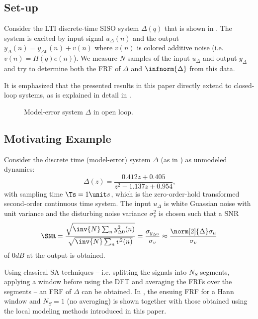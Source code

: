 \subsection{Set-up}
Consider the \gls{LTI} discrete-time \gls{SISO} system $\Delta(q)$ that is shown in . 
The system is excited by input signal $u_{\Delta}(n)$ and the output $y_{\Delta}(n) = y_{\Delta0}(n) + v(n)$ where $v(n)$ is colored additive noise (i.e. $v(n) = H(q)e(n)$).
We measure $N$ samples of the input $u_{\Delta}$ and output $y_{\Delta}$ and try to determine both the \gls{FRF} of $\Delta$ and $\infnorm{\Delta}$ from this data.

It is emphasized that the presented results in this paper directly extend to closed-loop systems, as is explained in detail in . 
\begin{figure}
  \centering
  
  \caption{Model-error system $\Delta$ in open loop.}
  \label{fig:DeltaOpenLoop}
\end{figure}

\subsection{Motivating Example}
\label{sec:example}
Consider the discrete time (model-error) system $\Delta$ (as in ) as unmodeled dynamics:
\begin{equation}
  \Delta(z) = \frac{0.412 z + 0.405}{z^2 - 1.137 z + 0.954}
  \label{eq:O2sysDT}
  \text{,}
\end{equation}
with  sampling time $\Ts=\TsValue$, which is the zero-order-hold transformed second-order continuous time system.
The input $u_{\Delta}$ is white Guassian noise with unit variance and the disturbing noise variance $\sigma_v^2$ is chosen such that a \gls{SNR} 
\begin{equation}
  \SNR = \frac{\sqrt{\inv{N}\sum_n y_{\Delta0}^2(n) }}%
              {\sqrt{\inv{N}\sum_n v^2(n) }}
       = \frac{\sigma_{y_{\Delta0}}}{\sigma_v}
       \approx \frac{\norm[2]{\Delta} \sigma_u}{\sigma_v}
  \label{eq:SNR}
\end{equation}
of $0\unit{dB}$ at the output is obtained.

Using classical \gls{SA} techniques -- i.e. splitting the signals into $N_S$ segments, applying a window before using the \gls{DFT} and averaging the \glspl{FRF} over the segments -- an \gls{FRF} of $\Delta$ can be obtained.
In , the ensuing \gls{FRF} for a Hann window and $N_S=1$ (no averaging) is shown together with those obtained using the local modeling methods introduced in this paper.

